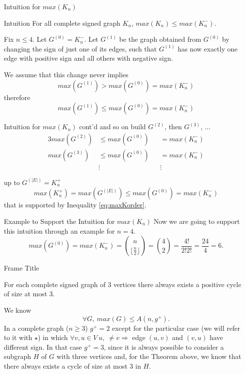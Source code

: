 \documentclass{beamer}
\newcommand{\floor}[1]{\lfloor #1 \rfloor}
\begin{document}
\begin{frame}{Intuition for $max(K_n)$}
    \justifying
    \begin{exampleblock}{Intuition}
        For all complete signed graph $K_n$, $max(K_n) \leq max(K_n^-)$.
    \end{exampleblock}
    Fix $n \leq 4$. Let $G^{(0)} = K_n^-$. Let $G^{(1)}$ be the graph obtained from $G^{(0)}$ by changing the sign of just one of its edges, such that $G^{(1)}$ has now exactly one edge with positive sign and all others with negative sign.
    
    We assume that this change never implies
    \[
        max(G^{(1)}) > max(G^{(0)}) = max(K_n^-)
    \]
    therefore
    \[
        max(G^{(1)}) \leq max(G^{(0)}) = max(K_n^-)
    \]
\end{frame}

\begin{frame}{Intuition for $max(K_n)$ cont'd}
\justifying
    and so on build $G^{(2)}$, then $G^{(3)}$, $\dots$
    \begin{alignat*}{3}
        max(G^{(2)}) &\leq max(G^{(0)}) &&= max(K_n^-)\\
        max(G^{(3)}) &\leq max(G^{(0)}) &&= max(K_n^-)\\
        &\vdots && \vdots 
    \end{alignat*}
        
    up to $G^{(|E|)} = K_n^+$
    \[
        max(K_n^+) = max(G^{(|E|)}) \leq max(G^{(0)}) = max(K_n^-)
    \]
    that is supported by Inequality \ref{eq:maxKorder}.
\end{frame}

\begin{frame}{Example to Support the Intuition for $max(K_n)$}
    \justifying
    Now we are going to support this intuition through an example for $n=4$.
    \[
        max(G^{(0)}) = max(K_n^-) = \binom{n}{\floor{\frac{n}{2}}} = \binom{4}{2} = \frac{4!}{2!2!} = \frac{24}{4} = 6.
    \]
    
\end{frame}

\begin{frame}{Frame Title}
    \justifying
    \begin{theorem}
    \justifying
    For each complete signed graph of 3 vertices there always exists a positive cycle of size at most 3.
    \end{theorem}
    We know 
    \[
        \forall G,\ max(G) \leq A(n,g^+).
    \]
    In a complete graph ($n \geq 3$) $g^+ = 2$ except for the particular case (we will refer to it with $\star$) in which $\forall v,u \in V\ u,\ \neq v \Rightarrow$ edge $(u,v)$ and $(v,u)$ have different sign. In that case $g^+ = 3$, since it is always possible to consider a subgraph $H$ of $G$ with three vertices and, for the Theorem above, we know that there always exists a cycle of size at most 3 in $H$.
\end{frame}
\end{document}
